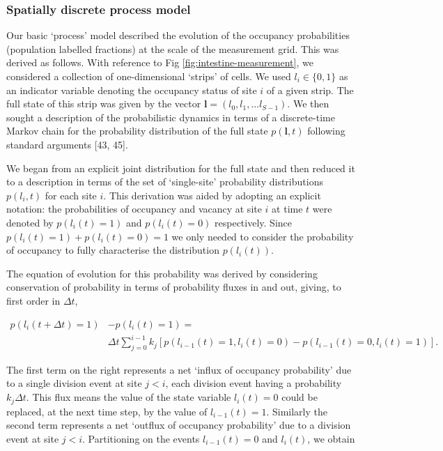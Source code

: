 \documentclass[10pt,letterpaper]{article}
\begin{document}
\subsubsection{Spatially discrete process
model}\label{spatially-discrete-process-model}

Our basic `process' model described the evolution of the occupancy
probabilities (population labelled fractions) at the scale of the
measurement grid. This was derived as follows. With reference to Fig
\ref{fig:intestine-measurement}, we considered a collection of
one-dimensional `strips' of cells. We used \(l_i \in \{0,1\}\) as an
indicator variable denoting the occupancy status of site \(i\) of a
given strip. The full state of this strip was given by the vector
\(\mathbf{l} = (l_0,l_1,...l_{S-1})\). We then sought a description of
the probabilistic dynamics in terms of a discrete-time Markov chain for
the probability distribution of the full state \(p(\mathbf{l},t)\)
following standard arguments {[}43, 45{]}.

We began from an explicit joint distribution for the full state and then
reduced it to a description in terms of the set of `single-site'
probability distributions \(p(l_i,t)\) for each site \(i\). This
derivation was aided by adopting an explicit notation: the probabilities
of occupancy and vacancy at site \(i\) at time \(t\) were denoted by
\(p(l_i(t)=1)\) and \(p(l_i(t)=0)\) respectively. Since
\(p(l_i(t)=1)+ p(l_i(t)=0) = 1\) we only needed to consider the
probability of occupancy to fully characterise the distribution
\(p(l_i(t))\).

The equation of evolution for this probability was derived by
considering conservation of probability in terms of probability fluxes
in and out, giving, to first order in \(\Delta t\),

\begin{align}p(l_i(t+\Delta t)=1) &- p(l_i(t)=1) = \nonumber \\ &\Delta t\sum_{j=0}^{i-1}k_j\left[p(l_{i-1}(t)=1,l_{i}(t)=0)-p(l_{i-1}(t)=0,l_{i}(t)=1)\right]. \end{align}

The first term on the right represents a net `influx of occupancy
probability' due to a single division event at site \(j < i\), each
division event having a probability \(k_j\Delta t\). This flux means the
value of the state variable \(l_i(t) = 0\) could be replaced, at the
next time step, by the value of \(l_{i-1}(t) = 1\). Similarly the second
term represents a net `outflux of occupancy probability' due to a
division event at site \(j < i\). Partitioning on the events
\(l_{i-1}(t)=0\) and \(l_i(t)\), we obtain
\end{document}

